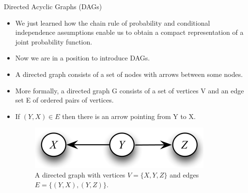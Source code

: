 \documentclass[handout]{beamer}
\begin{document}
\begin{frame}{Directed Acyclic Graphs (DAGs)}
\scriptsize{
\begin{itemize}

\item We just learned how the chain rule of probability and conditional independence assumptions enable us to obtain a compact representation of a joint probability function.

\item Now we are in a position to introduce DAGs.

\item A directed graph consists of a set of nodes with arrows between some nodes.



\item More formally, a directed graph G consists of a set of vertices V and an edge set E of ordered pairs of vertices.


\item If $(Y, X) \in E$  then there is an arrow pointing from Y to X. 

\begin{figure}[h!]
	\centering
	\includegraphics[scale=0.5]{pics/dag1.png}
	\caption{A directed graph with vertices $V = \{X, Y, Z\}$ and edges $E = \{(Y, X), (Y, Z)\}$.}
	\end{figure} 


 
\end{itemize}



} 

\end{frame}
\end{document}
